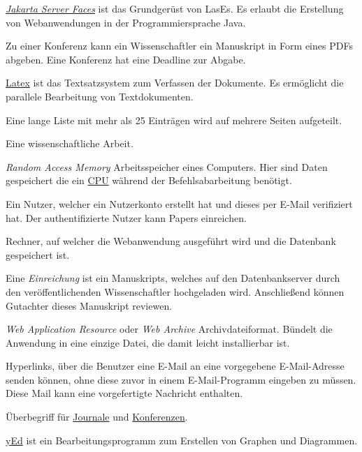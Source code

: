 \begin{description}
	 \href{https://jakarta.ee/specifications/faces/}{\emph{Jakarta Server Faces}} ist das Grundgerüst von LasEs. Es erlaubt die Erstellung von Webanwendungen in der Programmiersprache Java.

	 Zu einer Konferenz kann ein Wissenschaftler ein Manuskript in Form eines PDFs abgeben. Eine Konferenz hat eine Deadline zur Abgabe.

	 \href{https://www.latex-project.org/}{Latex} ist das Textsatzsystem zum Verfassen der Dokumente. Es ermöglicht die parallele Bearbeitung von Textdokumenten.

	 Eine lange Liste mit mehr als 25 Einträgen wird auf mehrere Seiten aufgeteilt.

	 Eine wissenschaftliche Arbeit.

	 \emph{Random Access Memory} Arbeitsspeicher eines Computers. Hier sind Daten gespeichert die ein \hyperref[glo:cpu]{CPU} während der Befehlsabarbeitung benötigt.

	 Ein Nutzer, welcher ein Nutzerkonto erstellt hat und dieses per E-Mail verifiziert hat. Der authentifizierte Nutzer kann Papers einreichen.

	 Rechner, auf welcher die Webanwendung ausgeführt wird und die Datenbank gespeichert ist.

	 Eine \emph{Einreichung} ist ein Manuskripts, welches auf den Datenbankserver durch den veröffentlichenden Wissenschaftler hochgeladen wird. Anschließend können Gutachter dieses Manuskript reviewen.

	 \emph{Web Application Resource} oder \emph{Web Archive} Archivdateiformat. Bündelt die Anwendung in eine einzige Datei, die damit leicht installierbar ist.

	 Hyperlinks, über die Benutzer eine E-Mail an eine vorgegebene E-Mail-Adresse senden können, ohne diese zuvor in einem E-Mail-Programm eingeben zu müssen. Diese Mail kann eine vorgefertigte Nachricht enthalten.

	 Überbegriff für \hyperref[glo:journal]{Journale} und \hyperref[glo:konf]{Konferenzen}.

	 \href{https://www.yworks.com/products/yed}{yEd} ist ein Bearbeitungsprogramm zum Erstellen von Graphen und Diagrammen.
\end{description}